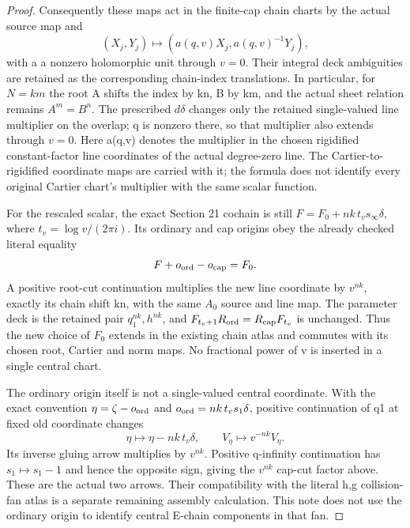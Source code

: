 \begin{proof}
Consequently these maps act in the finite-cap chain charts by
the actual source map and
\[
 (X_j,Y_j)\longmapsto
           (a(q,v)X_j,a(q,v)^{-1}Y_j),
\]
with a a nonzero holomorphic unit through \(v=0\). Their integral
deck ambiguities are retained as the corresponding chain-index
translations. In particular, for \(N=km\) the root A shifts
the index by kn, B by km, and the actual sheet relation remains
\(A^m=B^n\). The prescribed \(d\delta\) changes only the retained
single-valued line multiplier on the overlap; q is nonzero
there, so that multiplier also extends through \(v=0\).
Here a(q,v) denotes the multiplier in the chosen rigidified
constant-factor line coordinates of the actual degree-zero
line. The Cartier-to-rigidified coordinate maps are carried
with it; the formula does not identify every original Cartier
chart's multiplier with the same scalar function.

For the rescaled scalar, the exact Section 21 cochain is still
\(F=F_0+nk\,t_v s_\infty\delta\), where
\(t_v=\log v/(2\pi i)\). Its ordinary and cap origins obey
the already checked literal equality
\[
 F+o_{\rm ord}-o_{\rm cap}=F_0.
\]
A positive root-cut continuation multiplies the new line
coordinate by \(v^{nk}\), exactly its chain shift kn, with
the same \(A_0\) source and line map. The parameter deck is the
retained pair \(q_1^{nk},h^{nk}\), and
\(F_{t_v+1}R_{\rm ord}=R_{\rm cap}F_{t_v}\) is unchanged.
Thus the new choice of \(F_0\) extends in the existing chain atlas
and commutes with its chosen root, Cartier and norm maps. No
fractional power of v is inserted in a single central chart.

The ordinary origin itself is not a single-valued central
coordinate. With the exact convention
\(\eta=\zeta-o_{\rm ord}\) and
\(o_{\rm ord}=nk\,t_v s_1\delta\), positive continuation
of q1 at fixed old coordinate changes
\[
 \eta\longmapsto\eta-nk\,t_v\delta,
 \qquad V_\eta\longmapsto v^{-nk}V_\eta.
\]
Its inverse gluing arrow multiplies by \(v^{nk}\). Positive
q-infinity continuation has \(s_1\mapsto s_1-1\) and hence
the opposite sign, giving the \(v^{nk}\) cap-cut factor above.
These are the actual two arrows. Their compatibility with the
literal h,g collision-fan atlas is a separate remaining assembly
calculation. This note does not use the ordinary origin to
identify central E-chain components in that fan.


\end{proof}
